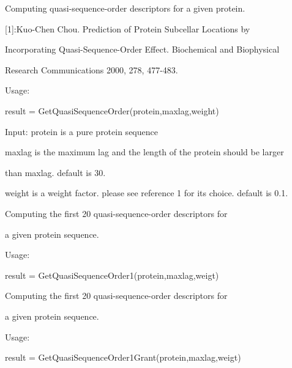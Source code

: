 \documentclass[letterpaper,10pt,english]{sphinxmanual}
\begin{document}
\begin{fulllineitems}
\label{reference/QuasiSequenceOrder:QuasiSequenceOrder.GetQuasiSequenceOrder}
Computing quasi-sequence-order descriptors for a given protein.

{[}1{]}:Kuo-Chen Chou. Prediction of Protein Subcellar Locations by

Incorporating Quasi-Sequence-Order Effect. Biochemical and Biophysical

Research Communications 2000, 278, 477-483.

Usage:

result = GetQuasiSequenceOrder(protein,maxlag,weight)

Input: protein is a pure protein sequence

maxlag is the maximum lag and the length of the protein should be larger

than maxlag. default is 30.

weight is a weight factor.  please see reference 1 for its choice. default is 0.1.

\end{fulllineitems}


\begin{fulllineitems}
\label{reference/QuasiSequenceOrder:QuasiSequenceOrder.GetQuasiSequenceOrder1}
Computing the first 20 quasi-sequence-order descriptors for

a given protein sequence.

Usage:

result = GetQuasiSequenceOrder1(protein,maxlag,weigt)

\end{fulllineitems}


\begin{fulllineitems}
\label{reference/QuasiSequenceOrder:QuasiSequenceOrder.GetQuasiSequenceOrder1Grant}
Computing the first 20 quasi-sequence-order descriptors for

a given protein sequence.

Usage:

result = GetQuasiSequenceOrder1Grant(protein,maxlag,weigt)

\end{fulllineitems}
\end{document}
